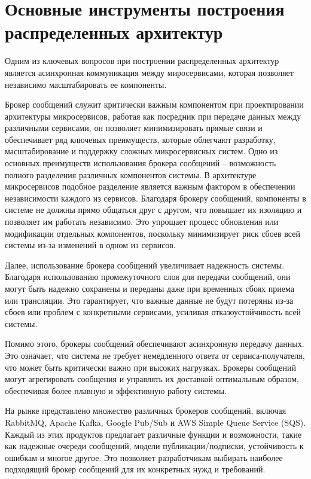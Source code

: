\section{Основные инструменты построения распределенных архитектур}

Одним из ключевых вопросов при построении распределенных архитектур является асинхронная коммуникация
между миросервисами, которая позволяет независимо масштабировать ее компоненты.

Брокер сообщений служит критически важным компонентом при проектировании архитектуры микросервисов, работая как посредник при передаче данных между различными сервисами, 
он позволяет минимизировать прямые связи и обеспечивает ряд ключевых преимуществ, которые облегчают разработку, масштабирование и поддержку сложных микросервисных систем.
Одно из основных преимуществ использования брокера сообщений -- возможность полного разделения различных компонентов системы. 
В архитектуре микросервисов подобное разделение является важным фактором в обеспечении независимости каждого из сервисов. 
Благодаря брокеру сообщений, компоненты в системе не должны прямо общаться друг с другом, что повышает их изоляцию и позволяет им работать независимо. 
Это упрощает процесс обновления или модификации отдельных компонентов, поскольку минимизирует риск сбоев всей системы из-за изменений в одном из сервисов.

Далее, использование брокера сообщений увеличивает надежность системы. Благодаря использованию промежуточного слоя для передачи сообщений, они могут быть надежно сохранены и переданы даже при временных сбоях приема или трансляции. 
Это гарантирует, что важные данные не будут потеряны из-за сбоев или проблем с конкретными сервисами, усиливая отказоустойчивость всей системы.

Помимо этого, брокеры сообщений обеспечивают асинхронную передачу данных. 
Это означает, что система не требует немедленного ответа от сервиса-получателя, что может быть критически важно при высоких нагрузках. 
Брокеры сообщений могут агрегировать сообщения и управлять их доставкой оптимальным образом, обеспечивая более плавную и эффективную работу системы.

На рынке представлено множество различных брокеров сообщений, включая RabbitMQ, Apache Kafka, Google Pub/Sub и AWS Simple Queue Service (SQS). 
Каждый из этих продуктов предлагает различные функции и возможности, такие как надежные очереди сообщений, модели публикации/подписки, устойчивость к ошибкам и многое другое. 
Это позволяет разработчикам выбирать наиболее подходящий брокер сообщений для их конкретных нужд и требований.

